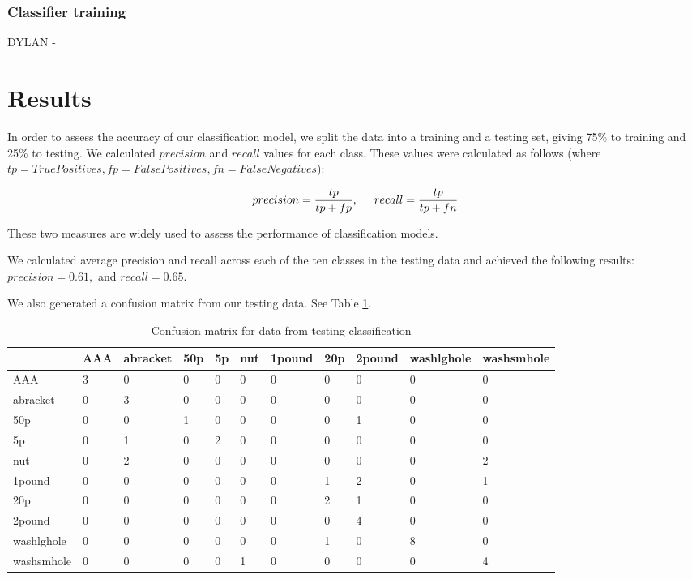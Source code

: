 \documentclass[12pt]{article}
\begin{document}
\subsubsection{Classifier training}

DYLAN - 


\section{Results}

In order to assess the accuracy of our classification model, we split the data into a training and a testing set, giving 75\% to training and 25\% to testing. We calculated $precision$ and $recall$ values for each class. These values were calculated as follows (where $tp=TruePositives,fp=FalsePositives,fn=FalseNegatives$):

\[precision=\frac{tp}{tp+fp},\hspace{5mm}recall=\frac{tp}{tp+fn}\]

These two measures are widely used to assess the performance of classification models.

We calculated average precision and recall across each of the ten classes in the testing data and achieved the following results: $precision=0.61,$ and $recall=0.65.$

We also generated a confusion matrix from our testing data. See Table \ref{tab:conf}.

\begin{table}
	\centering
	\caption{Confusion matrix for data from testing classification}
	\label{tab:conf}
	\begin{tabular}{l|l|l|l|l|l|l|l|l|l|l}
					& AAA & abracket & 50p & 5p & nut & 1pound & 20p & 2pound & washlghole & washsmhole \\ \hline
		AAA 		& 3   & 0        & 0   & 0	& 0   & 0	   & 0   & 0      & 0          & 0          \\ \hline
		abracket 	& 0   & 3        & 0   & 0 	& 0   & 0	   & 0   & 0      & 0          & 0          \\ \hline
		50p 		& 0   & 0        & 1   & 0	& 0   & 0	   & 0   & 1      & 0          & 0          \\ \hline
		5p 			& 0   & 1        & 0   & 2	& 0   & 0	   & 0   & 0      & 0          & 0          \\ \hline
		nut 		& 0   & 2		 & 0   & 0	& 0   & 0	   & 0   & 0      & 0          & 2          \\ \hline
		1pound 		& 0   & 0		 & 0   & 0	& 0   & 0	   & 1   & 2      & 0          & 1          \\ \hline
		20p		 	& 0   & 0		 & 0   & 0	& 0   & 0	   & 2   & 1      & 0          & 0          \\ \hline
		2pound 		& 0   & 0		 & 0   & 0	& 0   & 0	   & 0   & 4      & 0          & 0          \\ \hline
		washlghole 	& 0   & 0		 & 0   & 0	& 0   & 0	   & 1   & 0      & 8          & 0          \\ \hline
		washsmhole 	& 0   & 0		 & 0   & 0	& 1   & 0	   & 0   & 0      & 0          & 4         
	\end{tabular}
\end{table}
\end{document}
